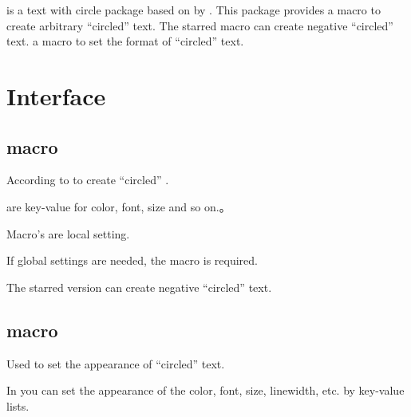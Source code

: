 \documentclass[full]{l3doc}
\begin{document}
\begin{documentation}
 is a text with circle package based on%
 by . This package provides a macro
 to create arbitrary ``circled'' text. The 
starred macro can create negative ``circled'' text.
a macro  to set the format of ``circled''
text.

\section{Interface}

\subsection{ macro}

\begin{function}{\circledtext}
  \begin{syntax}
      
  \end{syntax}
\end{function}

  According to  to create ``circled''
  .

   are key-value for color, font, size and so on.。

  Macro's  are local setting.

  If global settings are needed, the  macro is required.

  The starred version can create negative ``circled'' text.

\begin{SideBySideExample}[frame=single,numbers=left,xrightmargin=.45\linewidth,gobble=2]
  \centering
  \quad
  \quad
  \quad
\end{SideBySideExample}
\subsection{ macro}

\begin{function}{\circledtextset}
  \begin{syntax}
     
  \end{syntax}
\end{function}

  Used to set the appearance of ``circled'' text.

  In  you can set the appearance of the 
  color, font, size, linewidth, etc. by key-value lists.


\end{documentation}
\end{document}
